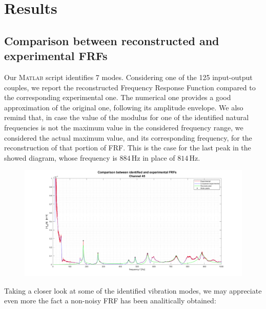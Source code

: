 \documentclass[a4paper,12pt,oneside]{article}
\begin{document}


\section{Results}

\subsection{Comparison between reconstructed and experimental FRFs}

Our \textsc{Matlab} script identifies 7 modes. Considering one of the 125 input-output couples, we report the reconstructed Frequency Response Function compared to the corresponding experimental one. The numerical one provides a good approximation of the original one, following its amplitude envelope. We also remind that, in case the value of the modulus for one of the identified natural frequencies is not the maximum value in the considered frequency range, we considered the actual maximum value, and its corresponding frequency, for the reconstruction of that portion of FRF. This is the case for the last peak in the showed diagram, whose frequency is $ 884 \, \text{Hz} $ in place of $ 814 \, \text{Hz} $.

\begin{figure}[H]
	\hspace{-70pt}
	\includegraphics[scale=0.4]{frf_rec_vs_exp_ch45}
\end{figure}

Taking a closer look at some of the identified vibration modes, we may appreciate even more the fact a non-noisy FRF has been analitically obtained:
\end{document}
